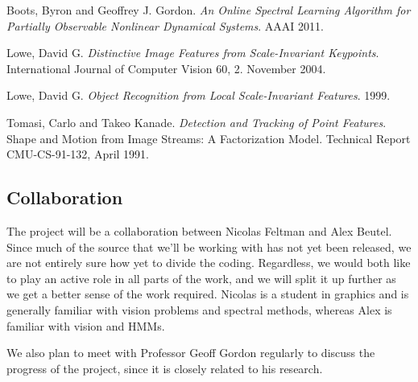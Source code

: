 \documentclass{article}
\begin{document}


	\begin{thebibliography}{9}

			Boots, Byron and Geoffrey J. Gordon.
			\emph{An Online Spectral Learning Algorithm for Partially Observable Nonlinear Dynamical Systems}.
			AAAI 2011.

			Lowe, David G.
			\emph{Distinctive Image Features from Scale-Invariant Keypoints}.
			International Journal of Computer Vision 60, 2. November 2004.

			Lowe, David G.
			\emph{Object Recognition from Local Scale-Invariant Features}.
			1999.

			Tomasi, Carlo and Takeo Kanade.
			\emph{Detection and Tracking of Point Features}.
			Shape and Motion from Image Streams: A Factorization Model.
			Technical Report CMU-CS-91-132,
			April 1991.

	\end{thebibliography}
	

	\subsection*{Collaboration} %
	\label{sub:Collaboration}

	The project will be a collaboration between Nicolas Feltman and Alex
	Beutel.  Since much of the source that we'll be working with has not yet been released,
	we are not entirely sure how yet to divide the coding.  Regardless, we would both like to 
	play an active role in all parts of the work, and we will split it up further as we get a 
	better sense of the work required.  Nicolas is a student	in graphics and is generally 
	familiar with vision problems and spectral methods, whereas Alex is familiar with vision and HMMs.

	We also plan to meet with Professor Geoff Gordon regularly to discuss the
	progress of the project, since it is closely related to his research.
	

	
\end{document}

